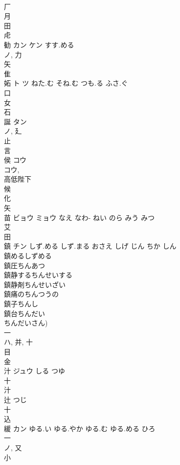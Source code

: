 \documentclass[8pt]{extreport}
\begin{document}
\begin{CJK}{UTF8}{min}
\\	厂 
\\	月 
\\	田 
\\	虍 
\\	勧	カン ケン	すす.める	
\\	ノ, 力 
\\	矢 
\\	隹 
\\	妬	ト ツ	ねた.む そね.む つも.る ふさ.ぐ	
\\	口 
\\	女 
\\	石 
\\	誕	タン		
\\	ノ, 廴 
\\	止 
\\	言 
\\	侯	コウ		
\\	コウ, 
\\	高低陛下 
\\	候 
\\	化 
\\	矢 
\\	苗	ビョウ ミョウ	なえ なわ- ねい のら みう みつ	
\\	艾 
\\	田 
\\	鎮	チン	しず.める しず.まる おさえ しげ じん ちか しん	
\\	鎮めるしずめる
\\	鎮圧ちんあつ
\\	鎮静するちんせいする
\\	鎮静剤ちんせいざい
\\	鎮痛のちんつうの
\\	鎮子ちんし
\\	鎮台ちんだい
\\	ちんだいさん)
\\	一 
\\	ハ, 并, 十 
\\	目 
\\	金 
\\	汁	ジュウ	しる つゆ	
\\	十 
\\	汁 
\\	辻		つじ	
\\	十 
\\	込 
\\	緩	カン	ゆる.い ゆる.やか ゆる.む ゆる.める ひろ	
\\	一 
\\	ノ, 又 
\\	小 

\end{CJK}
\end{document}
